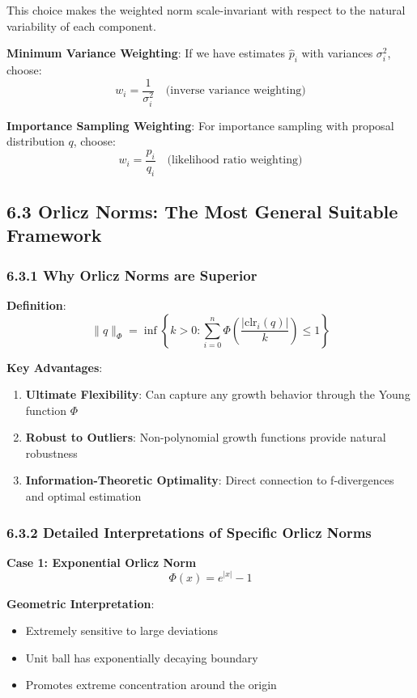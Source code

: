 \documentclass{amsart}
\theoremstyle{plain}
\theoremstyle{definition}
\theoremstyle{remark}
\begin{document}
This choice makes the weighted norm scale-invariant with respect to the natural variability of each component.

\textbf{Minimum Variance Weighting}:
If we have estimates $\hat{p}_i$ with variances $\sigma_i^2$, choose:
\[
w_i = \frac{1}{\sigma_i^2} \quad \text{(inverse variance weighting)}
\]

\textbf{Importance Sampling Weighting}:
For importance sampling with proposal distribution $q$, choose:
\[
w_i = \frac{p_i}{q_i} \quad \text{(likelihood ratio weighting)}
\]

\subsection{6.3 Orlicz Norms: The Most General Suitable Framework}

\subsubsection{6.3.1 Why Orlicz Norms are Superior}

\textbf{Definition}:
\[
\|q\|_\Phi = \inf \left\{ k > 0 : \sum_{i=0}^n \Phi\left(\frac{|\text{clr}_i(q)|}{k}\right) \leq 1 \right\}
\]

\textbf{Key Advantages}:

\begin{enumerate}
	\item \textbf{Ultimate Flexibility}: Can capture any growth behavior through the Young function $\Phi$
	\item \textbf{Robust to Outliers}: Non-polynomial growth functions provide natural robustness
	\item \textbf{Information-Theoretic Optimality}: Direct connection to f-divergences and optimal estimation
\end{enumerate}

\subsubsection{6.3.2 Detailed Interpretations of Specific Orlicz Norms}

\textbf{Case 1: Exponential Orlicz Norm}
\[
\Phi(x) = e^{|x|} - 1
\]

\textbf{Geometric Interpretation}:

\begin{itemize}
	\item Extremely sensitive to large deviations
	\item Unit ball has exponentially decaying boundary
	\item Promotes extreme concentration around the origin
\end{itemize}
\end{document}
